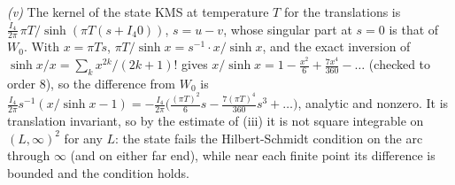 \emph{(v)} The kernel of the state KMS at temperature $T$ for the translations is $\tfrac{I_{4}}{2\pi}\,\pi T/\sinh(\pi T(s + I_{4}0))$, $s = u - v$, whose singular part at $s = 0$ is that of $W_{0}$. With $x = \pi T s$, $\pi T/\sinh x = s^{-1}\cdot x/\sinh x$, and the exact inversion of $\sinh x/x = \sum_{k} x^{2k}/(2k + 1)!$ gives $x/\sinh x = 1 - \tfrac{x^{2}}{6} + \tfrac{7x^{4}}{360} - \dots$ (checked to order $8$), so the difference from $W_{0}$ is $\tfrac{I_{4}}{2\pi}s^{-1}(x/\sinh x - 1) = -\tfrac{I_{4}}{2\pi}\big(\tfrac{(\pi T)^{2}}{6}s - \tfrac{7(\pi T)^{4}}{360}s^{3} + \dots\big)$, analytic and nonzero. It is translation invariant, so by the estimate of (iii) it is not square integrable on $(L, \infty)^{2}$ for any $L$: the state fails the Hilbert-Schmidt condition on the arc through $\infty$ (and on either far end), while near each finite point its difference is bounded and the condition holds.

